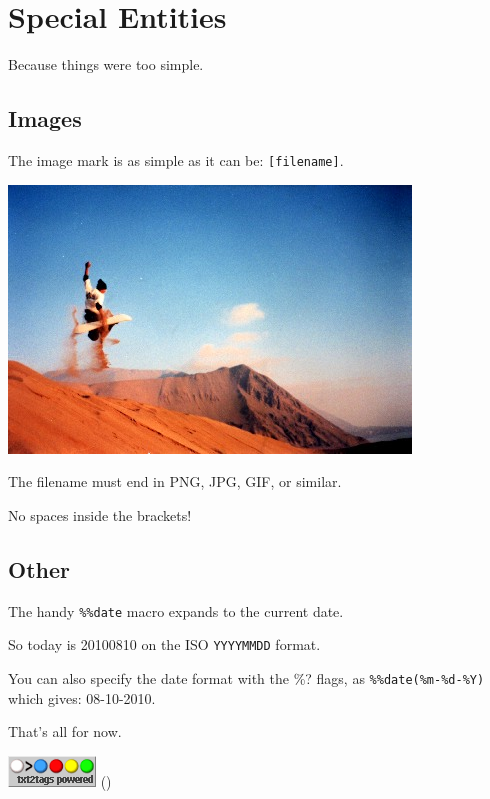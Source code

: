 \documentclass{article}
\begin{document}
\section*{Special Entities}

Because things were too simple.

\subsection*{Images}

The image mark is as simple as it can be: \texttt{[filename]}.

                      \includegraphics{img/photo.jpg}  

\begin{compactitem}
\item The filename must end in PNG, JPG, GIF, or similar.
\item No spaces inside the brackets!
\end{compactitem}

\subsection*{Other}

The handy \texttt{\%\%date} macro expands to the current date.

So today is 20100810 on the ISO \texttt{YYYYMMDD} format.

You can also specify the date format with the \%? flags,
as \texttt{\%\%date(\%m-\%d-\%Y)} which gives: 08-10-2010.

That's all for now.

\hrulefill{}

\includegraphics{img/t2tpowered.png} ()

\end{document}
